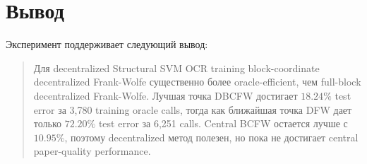 \documentclass[11pt,a4paper]{article}
\begin{document}
\section{Вывод}

Эксперимент поддерживает следующий вывод:

\begin{quote}
Для decentralized Structural SVM OCR training block-coordinate decentralized Frank-Wolfe существенно более oracle-efficient, чем full-block decentralized Frank-Wolfe. Лучшая точка DBCFW достигает \(18.24\%\) test error за 3,780 training oracle calls, тогда как ближайшая точка DFW дает только \(72.20\%\) test error за 6,251 calls. Central BCFW остается лучше с \(10.95\%\), поэтому decentralized метод полезен, но пока не достигает central paper-quality performance.
\end{quote}



\end{document}

